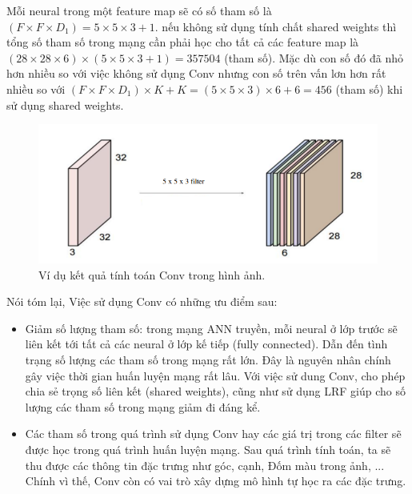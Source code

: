 	Mỗi neural trong một feature map sẽ có số tham số là $(F \times F \times D_1) = 5 \times 5 \times 3 + 1$. nếu không sử dụng tính chất shared weights thì tổng số tham số trong mạng cần phải học cho tất cả các feature map là $(28 \times 28 \times 6) \times (5 \times 5 \times 3 + 1) = 357504$ (tham số). Mặc dù con số đó đã nhỏ hơn nhiều so với việc không sử dụng Conv nhưng con số trên vấn lơn hơn rất nhiều so với $(F \times F \times D_1) \times K + K = (5 \times 5 \times 3) \times 6 + 6 = 456$ (tham số) khi sử dụng shared weights. \par
	
\begin{figure}[ht]
  			\begin{center}
    				\includegraphics[scale=0.5]{ConvVD} 
    				\caption[Caption for LOF]{Ví dụ kết quả tính toán Conv trong hình ảnh.}
    				\label{ConvVD}
  			\end{center}
\end{figure}	

Nói tóm lại, Việc sử dụng Conv có những ưu điểm sau:
\begin{itemize}
	\item Giảm số lượng tham số: trong mạng ANN truyền, mỗi neural ở lớp trước sẽ liên kết tới tất cả các neural ở lớp kế tiếp (fully connected). Dẫn đến tình trạng số lượng các tham số trong mạng rất lớn. Đây là nguyên nhân chính gây việc thời gian huấn luyện mạng rất lâu. Với việc sử dung Conv, cho phép chia sẻ trọng số liên kết (shared weights), cũng như sử dụng LRF giúp cho số lượng các tham số trong mạng giảm đi đáng kể.
	\item Các tham số trong quá trình sử dụng Conv hay các giá trị trong các filter sẽ được học trong quá trình huấn luyện mạng. Sau quá trình tính toán, ta sẽ thu được các thông tin đặc trưng như góc, cạnh, Đốm màu trong ảnh, ... Chính vì thế, Conv còn có vai trò xây dựng mô hình tự học ra các đặc trưng.
\end{itemize}

